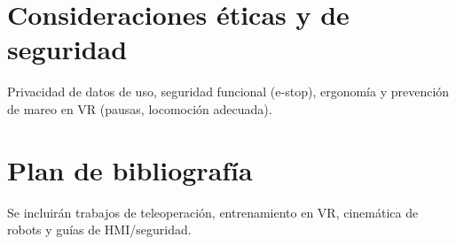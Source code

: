 \section{Consideraciones éticas y de seguridad}
Privacidad de datos de uso, seguridad funcional (e-stop), ergonomía y prevención de mareo en VR (pausas, locomoción adecuada).

\section{Plan de bibliografía}
Se incluirán trabajos de teleoperación, entrenamiento en VR, cinemática de robots y guías de HMI/seguridad. 


